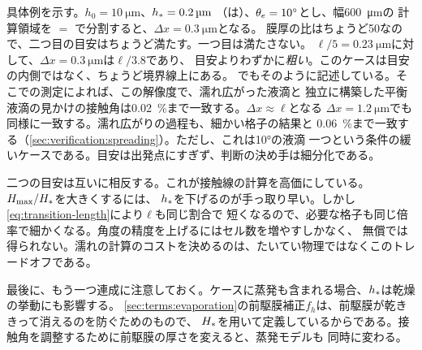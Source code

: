 具体例を示す。$h_0 = \SI{10}{\micro\metre}$、$h_{*} = \SI{0.2}{\micro\metre}$
（は）、$\theta_{e} = 10^\circ$とし、幅\SI{600}{\micro\metre}の
計算領域を $=$ で分割すると、$\Delta x = \SI{0.3}{\micro\metre}$となる。
膜厚の比はちょうど50なので、二つ目の目安はちょうど満たす。一つ目は満たさない。
$\ell/5 = \SI{0.23}{\micro\metre}$に対して、$\Delta x = \SI{0.3}{\micro\metre}$は$\ell/3.8$であり、
目安よりわずかに\emph{粗い}。このケースは目安の内側ではなく、ちょうど境界線上にある。
でもそのように記述している。そこでの測定によれば、この解像度で、濡れ広がった液滴と
独立に構築した平衡液滴の見かけの接触角は\SI{0.02}{\percent}まで一致する。$\Delta x \approx \ell$となる
$\Delta x = \SI{1.2}{\micro\metre}$でも同様に一致する。濡れ広がりの過程も、細かい格子の結果と
\SI{0.06}{\percent}まで一致する（\cref{sec:verification:spreading}）。ただし、これは\ang{10}の液滴
一つという条件の緩いケースである。目安は出発点にすぎず、判断の決め手は細分化である。

二つの目安は互いに相反する。これが接触線の計算を高価にしている。$H_{\mathrm{max}}/H_{*}$を大きくするには、
$h_{*}$を下げるのが手っ取り早い。しかし\cref{eq:transition-length}により$\ell$も同じ割合で
短くなるので、必要な格子も同じ倍率で細かくなる。角度の精度を上げるにはセル数を増やすしかなく、
無償では得られない。濡れの計算のコストを決めるのは、たいてい物理ではなくこのトレードオフである。

最後に、もう一つ連成に注意しておく。ケースに蒸発も含まれる場合、$h_{*}$は乾燥の挙動にも影響する。
\cref{sec:terms:evaporation}の前駆膜補正$f_h$は、前駆膜が乾ききって消えるのを防ぐためのもので、
$H_{*}$を用いて定義しているからである。接触角を調整するために前駆膜の厚さを変えると、蒸発モデルも
同時に変わる。
